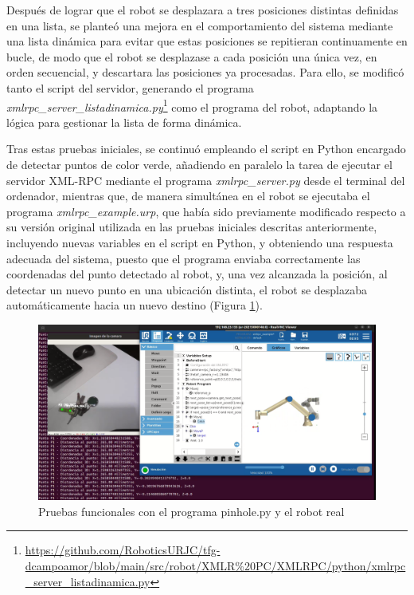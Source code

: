 Después de lograr que el robot se desplazara a tres posiciones distintas definidas en una lista, se planteó una mejora en el comportamiento del sistema mediante una lista dinámica para evitar que estas posiciones se repitieran continuamente en bucle, de modo que el robot se desplazase a cada posición una única vez, en orden secuencial, y descartara las posiciones ya procesadas. Para ello, se modificó tanto el script del servidor, generando el programa \textit{xmlrpc\_server\_listadinamica.py}\footnote{\url{https://github.com/RoboticsURJC/tfg-dcampoamor/blob/main/src/robot/XMLR\%20PC/XMLRPC/python/xmlrpc_server_listadinamica.py}} como el programa del robot, adaptando la lógica para gestionar la lista de forma dinámica.

Tras estas pruebas iniciales, se continuó empleando el script en Python encargado de detectar puntos de color verde, añadiendo en paralelo la tarea de ejecutar el servidor XML-RPC mediante el programa \textit{xmlrpc\_server.py} desde el terminal del ordenador, mientras que, de manera simultánea en el robot se ejecutaba el programa \textit{xmlrpc\_example.urp}, que había sido previamente modificado respecto a su versión original utilizada en las pruebas iniciales descritas anteriormente, incluyendo nuevas variables en el script en Python, y obteniendo una respuesta adecuada del sistema, puesto que el programa enviaba correctamente las coordenadas del punto detectado al robot, y, una vez alcanzada la posición, al detectar un nuevo punto en una ubicación distinta, el robot se desplazaba automáticamente hacia un nuevo destino (Figura \ref{fig:pinhole_UR}). 

    \begin{figure}[H]
     \centering
     \begin{center}
       \includegraphics[width=155mm]{figs/Programa robot posetrans UR10e.png}
     \end{center}
     \caption{Pruebas funcionales con el programa pinhole.py y el robot real}
     \label{fig:pinhole_UR}
  \end{figure}

